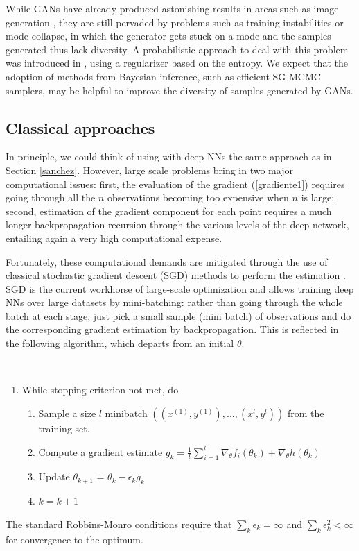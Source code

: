 While GANs have already produced astonishing results in areas such as image generation \citep{Karras2019stylegan2,brock2018large}, they are still pervaded by problems such as training instabilities or mode collapse, in which the generator gets stuck on a mode and the samples generated thus lack diversity. A probabilistic approach to deal with this problem was introduced in \cite{dieng2019prescribed}, using a regularizer based on the entropy. We expect that the adoption of methods from  Bayesian inference, such as efficient SG-MCMC samplers, may be helpful to improve the diversity of samples generated by GANs.

\subsection{Classical approaches}

In principle, we could think of using 
with deep NNs the same approach as in Section \ref{sanchez}. However,
 large scale problems bring in two major
computational issues: first, the 
evaluation of the gradient (\ref{gradiente1}) 
requires going through all the $n$ observations
 becoming too expensive when $n$ is large;
second, estimation of the gradient component
for each point requires a much longer backpropagation recursion through the various levels of the
deep network, 
entailing again a very high computational 
expense. 

Fortunately, these computational demands are mitigated
through the use of classical stochastic gradient descent
(SGD)
methods \citep{robbins}
to perform the estimation \citep{bottou2010large}. SGD is the current workhorse of large-scale optimization and 
allows training deep NNs over large datasets by mini-batching: rather than going through the whole batch at each stage, just pick a small sample
(mini batch) of observations and do the corresponding
gradient estimation by backpropagation. This is reflected in the following algorithm, which departs from an
initial $\theta$.
{\tt 
\begin{enumerate}
  \item  While stopping criterion not met, do\\
  \begin{enumerate}
      \item  Sample a size $l$ minibatch 
      $((x^{(1)}, y^{(1)}),..., (x^{l},y^{l})) $
              from the training set. 
            \item Compute a gradient estimate
      $g_k = \frac{1}{l} \sum_{i=1}^l \nabla_{\theta} f_i(\theta_k) + \nabla_{\theta} h(\theta_k)$
      \item Update $\theta_{k+1} $ = $\theta_k -\epsilon _k g_k$
      \item $k=k+1$
      \end{enumerate}
          \end{enumerate}
}
\noindent The standard Robbins-Monro conditions require
that $\sum _k \epsilon_k = \infty$ and 
$\sum _k \epsilon _k^2 < \infty $ for convergence to the optimum.

